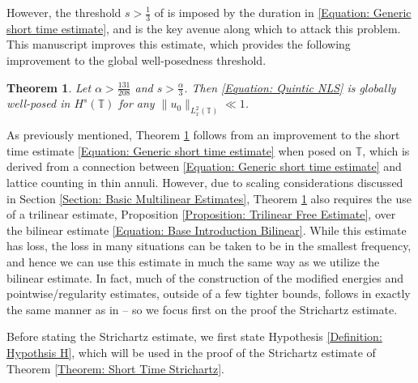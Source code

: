 \documentclass[12pt, letterpaper]{amsart}
\newtheorem{theorem}{Theorem}
\begin{document}
However, the threshold $s > \frac{1}{3}$ of \cite{schippa2024improved} is imposed by the duration in \eqref{Equation: Generic short time estimate}, and is the key avenue along which to attack this problem. This manuscript improves this estimate, which provides the following improvement to the global well-posedness threshold.
\begin{theorem}\label{Theorem: GWP theorem}
    Let $\alpha > \frac{131}{208}$ and $s > \frac{\alpha}{3}$. Then \eqref{Equation: Quintic NLS} is globally well-posed in $H^s(\mathbb{T})$ for any $\|u_0\|_{L^2_{x}(\mathbb{T})}\ll 1$.
\end{theorem}

As previously mentioned, Theorem \ref{Theorem: GWP theorem} follows from an improvement to the short time estimate \eqref{Equation: Generic short time estimate} when posed on $\mathbb{T}$, which is derived from a connection between \eqref{Equation: Generic short time estimate} and lattice counting in thin annuli. However, due to scaling considerations discussed in Section \ref{Section: Basic Multilinear Estimates}, Theorem \ref{Theorem: GWP theorem} also requires the use of a trilinear estimate, Proposition \ref{Proposition: Trilinear Free Estimate}, over the bilinear estimate \eqref{Equation: Base Introduction Bilinear}. While this estimate has loss, the loss in many situations can be taken to be in the smallest frequency, and hence we can use this estimate in much the same way as we utilize the bilinear estimate. In fact, much of the construction of the modified energies and pointwise/regularity estimates, outside of a few tighter bounds, follows in exactly the same manner as in \cite{schippa2024improved}-- so we focus first on the proof the Strichartz estimate.

Before stating the Strichartz estimate, we first state Hypothesis \ref{Definition: Hypothsis H}, which will be used in the proof of the Strichartz estimate of Theorem \ref{Theorem: Short Time Strichartz}.
\end{document}
